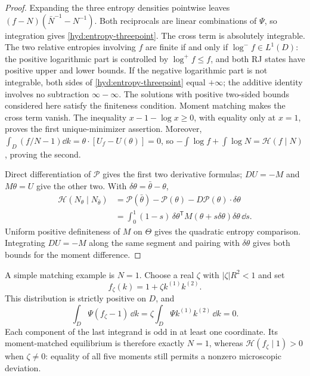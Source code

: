 \begin{proof}
 Expanding the three entropy densities pointwise leaves
 $(f-N)(\bar N^{-1}-N^{-1})$. Both reciprocals are linear combinations
 of $\Psi$, so integration gives \eqref{hyd:entropy-threepoint}.
 The cross term is absolutely integrable. The two relative entropies
 involving $f$ are finite if and only if $\log^-f\in L^1(D)$: the positive
 logarithmic part is controlled by $\log^+f\le f$, and both RJ states have
 positive upper and lower bounds. If the negative logarithmic part is
 not integrable, both sides of \eqref{hyd:entropy-threepoint} equal
 $+\infty$; the additive identity involves no subtraction
 $\infty-\infty$. The solutions with positive two-sided bounds considered
 here satisfy the finiteness condition. Moment matching makes the cross
 term vanish. The inequality $x-1-\log x\ge0$, with equality only at $x=1$,
 proves the first unique-minimizer assertion. Moreover,
 $\int_D(f/N-1)\dd k=\theta\cdot[U_f-U(\theta)]=0$, so
 $-\int\log f+\int\log N=\mathscr H(f\mid N)$, proving the second.

 Direct differentiation of $\mathcal P$ gives the first two derivative
 formulas; $DU=-M$ and $M\theta=U$ give the other two. With
 $\delta\theta=\bar\theta-\theta$,
 \[
 \begin{aligned}
 \mathscr H(N_\theta\mid N_{\bar\theta})
 &=\mathcal P(\bar\theta)-\mathcal P(\theta)
                   -D\mathcal P(\theta)\cdot\delta\theta\\
 &=\int_0^1(1-s)\,\delta\theta^{\mathsf T}
         M(\theta+s\delta\theta)\delta\theta\,\dd s.
 \end{aligned}
 \]
 Uniform positive definiteness of $M$ on $\Theta$ gives the quadratic
 entropy comparison. Integrating $DU=-M$ along the same segment and
 pairing with $\delta\theta$ gives both bounds for the moment difference.
\end{proof}

A simple matching example is $N=1$. Choose a real $\zeta$ with
$|\zeta|R^2<1$ and set
\[
 f_\zeta(k)=1+\zeta k^{(1)}k^{(2)}.
\]
This distribution is strictly positive on $D$, and
\[
 \int_D\Psi(f_\zeta-1)\,\dd k
       =\zeta\int_D\Psi k^{(1)}k^{(2)}\,\dd k=0.
\]
Each component of the last integrand is odd in at least one coordinate.
Its moment-matched equilibrium is therefore exactly $N=1$, whereas
$\mathscr H(f_\zeta\mid1)>0$ when $\zeta\ne0$: equality of all five
moments still permits a nonzero microscopic deviation.

